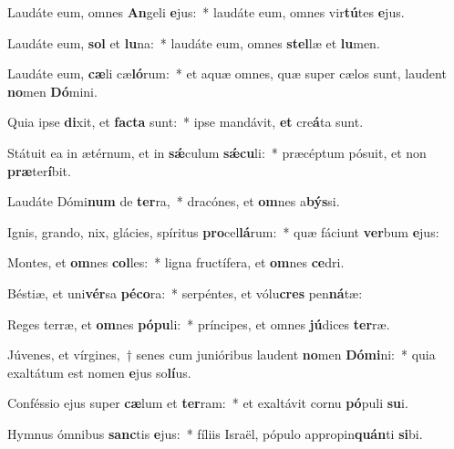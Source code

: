 \item Laudáte eum, omnes \textbf{An}geli \textbf{e}jus:~* laudáte eum, omnes vir\textbf{tú}tes \textbf{e}jus.
\item Laudáte eum, \textbf{sol} et \textbf{lu}na:~* laudáte eum, omnes \textbf{stel}læ et \textbf{lu}men.
\item Laudáte eum, \textbf{cæ}li cæ\textbf{ló}rum:~* et aquæ omnes, quæ super cælos sunt, laudent \textbf{no}men \textbf{Dó}mini.
\item Quia ipse \textbf{di}xit, et \textbf{fac}\textbf{ta} sunt:~* ipse mandávit, \textbf{et} cre\textbf{á}ta sunt.
\item Státuit ea in ætérnum, et in \textbf{sǽ}culum \textbf{sǽ}\textbf{cu}li:~* præcéptum pósuit, et non \textbf{præ}ter\textbf{í}bit.
\item Laudáte Dómi\textbf{num} de \textbf{ter}ra,~* dracónes, et \textbf{om}nes a\textbf{býs}si.
\item Ignis, grando, nix, glácies, spíritus \textbf{pro}cel\textbf{lá}rum:~* quæ fáciunt \textbf{ver}bum \textbf{e}jus:
\item Montes, et \textbf{om}nes \textbf{col}les:~* ligna fructífera, et \textbf{om}nes \textbf{ce}dri.
\item Béstiæ, et uni\textbf{vér}sa \textbf{pé}\textbf{co}ra:~* serpéntes, et vólu\textbf{cres} pen\textbf{ná}tæ:
\item Reges terræ, et \textbf{om}nes \textbf{pó}\textbf{pu}li:~* príncipes, et omnes \textbf{jú}dices \textbf{ter}ræ.
\item Júvenes, et vírgines,~† senes cum junióribus laudent \textbf{no}men \textbf{Dó}\textbf{mi}ni:~* quia exaltátum est nomen \textbf{e}jus so\textbf{lí}us.
\item Conféssio ejus super \textbf{cæ}lum et \textbf{ter}ram:~* et exaltávit cornu \textbf{pó}puli \textbf{su}i.
\item Hymnus ómnibus \textbf{sanc}tis \textbf{e}jus:~* fíliis Israël, pópulo appropin\textbf{quán}ti \textbf{si}bi.
